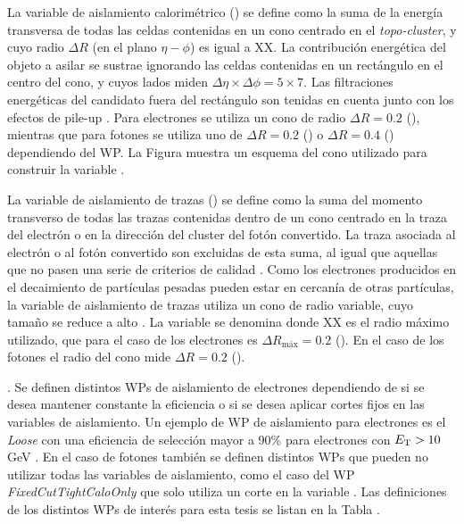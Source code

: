 La variable de aislamiento calorimétrico \cite{PERF-2017-01} () se define como la suma de la energía transversa de todas las celdas contenidas en un cono centrado en el \textit{topo-cluster}, y cuyo radio $\Delta R$  (en el plano $\eta-\phi$) es igual a XX. La contribución energética del objeto a asilar se sustrae ignorando las celdas contenidas en un rectángulo en el centro del cono, y cuyos lados miden $\Delta\eta\times\Delta\phi = 5 \times 7$. Las filtraciones energéticas del candidato fuera del rectángulo son tenidas en cuenta junto con los efectos de pile-up \cite{Cacciari}. Para electrones se utiliza un cono de radio $\Delta R = 0.2$ (), mientras que para fotones se utiliza uno de $\Delta R = 0.2$ () o $\Delta R = 0.4$ () dependiendo del WP. La Figura  muestra un esquema del cono utilizado para construir la variable .

La variable de aislamiento de trazas () se define como la suma del momento transverso de todas las trazas contenidas dentro de un cono centrado en la traza del electrón o en la dirección del cluster del fotón convertido. La traza asociada al electrón o al fotón convertido son excluidas de esta suma, al igual que aquellas que no pasen una serie de criterios de calidad . Como los electrones producidos en el decaimiento de partículas pesadas pueden estar en cercanía de otras partículas, la variable de aislamiento de trazas utiliza un cono de radio variable, cuyo tamaño se reduce a alto \pt. La variable se denomina  donde XX es el radio máximo utilizado, que para el caso de los electrones es $\Delta R_{\text{máx}} = 0.2$ (). En el caso de los fotones el radio del cono mide $\Delta R = 0.2$ ().

. Se definen distintos WPs de aislamiento de electrones dependiendo de si se desea mantener constante la eficiencia o si se desea aplicar cortes fijos en las variables de aislamiento. Un ejemplo de WP de aislamiento para electrones es el \textit{Loose} con una eficiencia de selección mayor a 90\% para electrones con $E_{\text{T}}>10$ GeV \cite{EGAM-2018-01}. En el caso de fotones también se definen distintos WPs que pueden no utilizar todas las variables de aislamiento, como el caso del WP \textit{FixedCutTightCaloOnly} que solo utiliza un corte en la variable \ETcone. Las definiciones de los distintos WPs de interés para esta tesis se listan en la Tabla .









